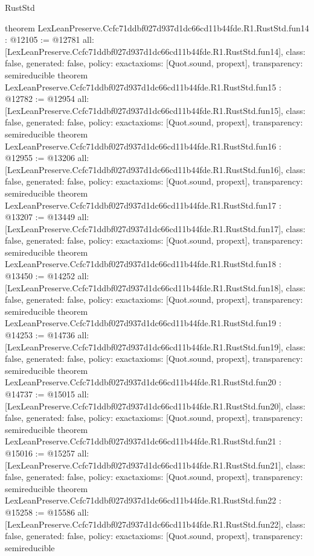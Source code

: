 \begin{lexlean}{RustStd}
\begin{coremodule}
{}
theorem LexLeanPreserve.Ccfc71ddbf027d937d1dc66cd11b44fde.R1.RustStd.fun14 : @12105 := @12781 {
  all: [LexLeanPreserve.Ccfc71ddbf027d937d1dc66cd11b44fde.R1.RustStd.fun14],
  class: false,
  generated: false,
  policy: exact{axioms: [Quot.sound, propext]},
  transparency: semireducible
}
theorem LexLeanPreserve.Ccfc71ddbf027d937d1dc66cd11b44fde.R1.RustStd.fun15 : @12782 := @12954 {
  all: [LexLeanPreserve.Ccfc71ddbf027d937d1dc66cd11b44fde.R1.RustStd.fun15],
  class: false,
  generated: false,
  policy: exact{axioms: [Quot.sound, propext]},
  transparency: semireducible
}
theorem LexLeanPreserve.Ccfc71ddbf027d937d1dc66cd11b44fde.R1.RustStd.fun16 : @12955 := @13206 {
  all: [LexLeanPreserve.Ccfc71ddbf027d937d1dc66cd11b44fde.R1.RustStd.fun16],
  class: false,
  generated: false,
  policy: exact{axioms: [Quot.sound, propext]},
  transparency: semireducible
}
theorem LexLeanPreserve.Ccfc71ddbf027d937d1dc66cd11b44fde.R1.RustStd.fun17 : @13207 := @13449 {
  all: [LexLeanPreserve.Ccfc71ddbf027d937d1dc66cd11b44fde.R1.RustStd.fun17],
  class: false,
  generated: false,
  policy: exact{axioms: [Quot.sound, propext]},
  transparency: semireducible
}
theorem LexLeanPreserve.Ccfc71ddbf027d937d1dc66cd11b44fde.R1.RustStd.fun18 : @13450 := @14252 {
  all: [LexLeanPreserve.Ccfc71ddbf027d937d1dc66cd11b44fde.R1.RustStd.fun18],
  class: false,
  generated: false,
  policy: exact{axioms: [Quot.sound, propext]},
  transparency: semireducible
}
theorem LexLeanPreserve.Ccfc71ddbf027d937d1dc66cd11b44fde.R1.RustStd.fun19 : @14253 := @14736 {
  all: [LexLeanPreserve.Ccfc71ddbf027d937d1dc66cd11b44fde.R1.RustStd.fun19],
  class: false,
  generated: false,
  policy: exact{axioms: [Quot.sound, propext]},
  transparency: semireducible
}
theorem LexLeanPreserve.Ccfc71ddbf027d937d1dc66cd11b44fde.R1.RustStd.fun20 : @14737 := @15015 {
  all: [LexLeanPreserve.Ccfc71ddbf027d937d1dc66cd11b44fde.R1.RustStd.fun20],
  class: false,
  generated: false,
  policy: exact{axioms: [Quot.sound, propext]},
  transparency: semireducible
}
theorem LexLeanPreserve.Ccfc71ddbf027d937d1dc66cd11b44fde.R1.RustStd.fun21 : @15016 := @15257 {
  all: [LexLeanPreserve.Ccfc71ddbf027d937d1dc66cd11b44fde.R1.RustStd.fun21],
  class: false,
  generated: false,
  policy: exact{axioms: [Quot.sound, propext]},
  transparency: semireducible
}
theorem LexLeanPreserve.Ccfc71ddbf027d937d1dc66cd11b44fde.R1.RustStd.fun22 : @15258 := @15586 {
  all: [LexLeanPreserve.Ccfc71ddbf027d937d1dc66cd11b44fde.R1.RustStd.fun22],
  class: false,
  generated: false,
  policy: exact{axioms: [Quot.sound, propext]},
  transparency: semireducible
}
\end{coremodule}
\end{lexlean}
